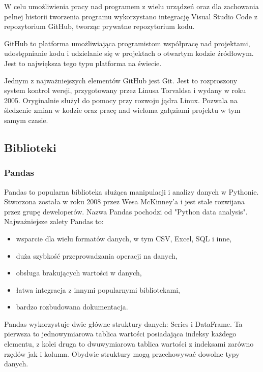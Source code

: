 \documentclass[12pt,twoside]{article}
\begin{document}
W celu umożliwienia pracy nad programem z wielu urządzeń oraz dla zachowania pełnej historii
tworzenia programu wykorzystano integrację Visual Studio Code z repozytorium GitHub, tworząc
prywatne repozytorium kodu. \cite{github}

GitHub to platforma umożliwiająca programistom współpracę nad projektami, udostępnianie kodu i
udzielanie się w projektach o otwartym kodzie źródłowym. Jest to największa tego typu platforma na świecie. \cite{github2}

Jednym z najważniejszych elementów GitHub jest Git. Jest to rozproszony system kontrol wersji,
przygotowany przez Linusa Torvaldsa i wydany w roku 2005. Oryginalnie służył do pomocy przy rozwoju jądra Linux.
Pozwala na śledzenie zmian w kodzie oraz pracę nad wieloma gałęziami projektu w tym samym czasie. \cite{git}

\subsection{Biblioteki}
\subsubsection{Pandas}

Pandas to popularna biblioteka służąca manipulacji i analizy danych w Pythonie.
Stworzona została w roku 2008 przez Wesa McKinney'a i jest stale rozwijana przez grupę deweloperów.
Nazwa Pandas pochodzi od "Python data analysis". \cite{pandas}
Najważniejsze zalety Pandas to:

\begin{itemize}[label=-,labelsep=0.4cm, leftmargin=1.25cm]
    \item wsparcie dla wielu formatów danych, w tym CSV, Excel, SQL i inne,
    \item duża szybkość przeprowadzania operacji na danych,
    \item obsługa brakujących wartości w danych,
    \item łatwa integracja z innymi popularnymi bibliotekami,
    \item bardzo rozbudowana dokumentacja.
\end{itemize}

Pandas wykorzystuje dwie główne struktury danych: Series i DataFrame.
Ta pierwsza to jednowymiarowa tablica wartości posiadająca indeksy każdego elementu,
z kolei druga to dwuwymiarowa tablica wartości z indeksami zarówno rzędów jak i kolumn.
Obydwie struktury mogą przechowywać dowolne typy danych. \cite{pandas2}
\end{document}
